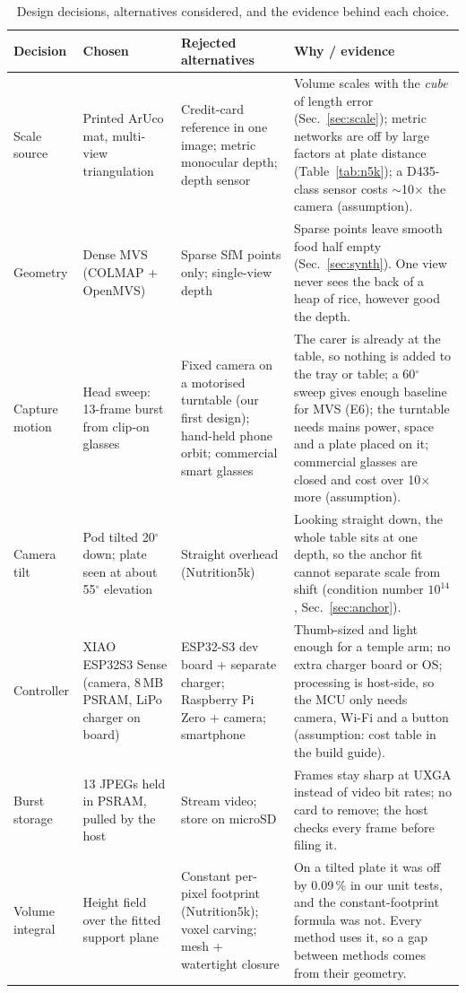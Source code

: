 \documentclass[conference]{IEEEtran}
\begin{document}
\begin{table}[t]
\centering\small
\caption{Design decisions, alternatives considered, and the evidence behind each choice.}
\label{tab:design}
\begin{tabular}{p{2.5cm}p{3.3cm}p{4.6cm}p{5.6cm}}
\toprule
Decision & Chosen & Rejected alternatives & Why / evidence \\
\midrule
Scale source & Printed ArUco mat, multi-view triangulation & Credit-card reference in one image; metric monocular depth; depth sensor & Volume scales with the \emph{cube} of length error (Sec.~\ref{sec:scale}); metric networks are off by large factors at plate distance (Table~\ref{tab:n5k}); a D435-class sensor costs $\sim$10$\times$ the camera (assumption). \\
Geometry & Dense MVS (COLMAP + OpenMVS) & Sparse SfM points only; single-view depth & Sparse points leave smooth food half empty (Sec.~\ref{sec:synth}). One view never sees the back of a heap of rice, however good the depth. \\
Capture motion & Head sweep: 13-frame burst from clip-on glasses & Fixed camera on a motorised turntable (our first design); hand-held phone orbit; commercial smart glasses & The carer is already at the table, so nothing is added to the tray or table; a 60$^\circ$ sweep gives enough baseline for MVS (E6); the turntable needs mains power, space and a plate placed on it; commercial glasses are closed and cost over 10$\times$ more (assumption). \\
Camera tilt & Pod tilted 20$^\circ$ down; plate seen at about 55$^\circ$ elevation & Straight overhead (Nutrition5k) & Looking straight down, the whole table sits at one depth, so the anchor fit cannot separate scale from shift (condition number $10^{14}$, Sec.~\ref{sec:anchor}). \\
Controller & XIAO ESP32S3 Sense (camera, 8\,MB PSRAM, LiPo charger on board) & ESP32-S3 dev board + separate charger; Raspberry Pi Zero + camera; smartphone & Thumb-sized and light enough for a temple arm; no extra charger board or OS; processing is host-side, so the MCU only needs camera, Wi-Fi and a button (assumption: cost table in the build guide). \\
Burst storage & 13 JPEGs held in PSRAM, pulled by the host & Stream video; store on microSD & Frames stay sharp at UXGA instead of video bit rates; no card to remove; the host checks every frame before filing it. \\
Volume integral & Height field over the fitted support plane & Constant per-pixel footprint (Nutrition5k); voxel carving; mesh + watertight closure & On a tilted plate it was off by 0.09\,\% in our unit tests, and the constant-footprint formula was not. Every method uses it, so a gap between methods comes from their geometry. \\

\end{tabular}
\end{table}
\end{document}
